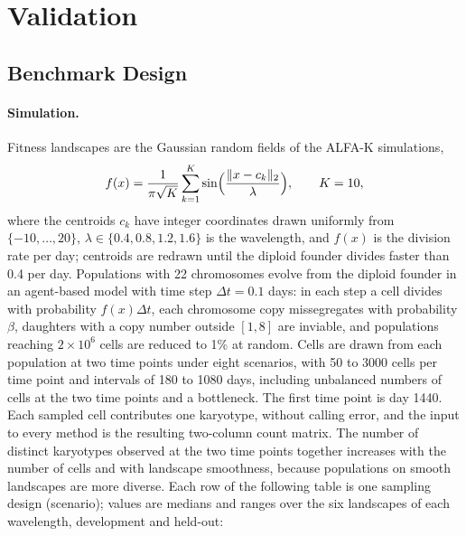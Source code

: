 \documentclass[11pt]{article}
\begin{document}
\section{Validation}
\label{sec:validation}

\subsection{Benchmark Design}
\label{sec:val-design}

\paragraph{Simulation.}
Fitness landscapes are the Gaussian random fields of the ALFA-K simulations,
\begin{equation}
  f(x)=\frac{1}{\pi\sqrt K}\sum_{k=1}^{K}\sin\Bigl(\frac{\lVert x-c_k\rVert_2}{\lambda}\Bigr),
  \qquad K=10,
  \label{eq:grf}
\end{equation}
where the centroids $c_k$ have integer coordinates drawn uniformly from
$\{-10,\ldots,20\}$, $\lambda\in\{0.4,0.8,1.2,1.6\}$ is the wavelength, and
$f(x)$ is the division rate per day; centroids are redrawn until the diploid
founder divides faster than 0.4 per day. Populations with 22 chromosomes
evolve from the diploid founder in an agent-based model with time step
$\Delta t=0.1$ days: in each step a cell divides with probability
$f(x)\Delta t$, each chromosome copy missegregates with probability $\beta$,
daughters with a copy number outside $[1,8]$ are inviable, and populations
reaching $2\times10^6$ cells are reduced to 1\% at random. Cells are
drawn from each population at two time points under eight scenarios, with 50
to 3000 cells per time point and intervals of 180 to 1080 days, including
unbalanced numbers of cells at the two time points and a bottleneck. The first time point is day 1440. Each sampled cell
contributes one karyotype, without calling error, and the input to every
method is the resulting two-column count matrix. The number of distinct
karyotypes observed at the two time points together increases with the number of cells
and with landscape smoothness, because populations on smooth landscapes are
more diverse. Each row of the following table is one sampling design
(scenario); values are medians and ranges over the six landscapes of each
wavelength, development and held-out:
\end{document}
